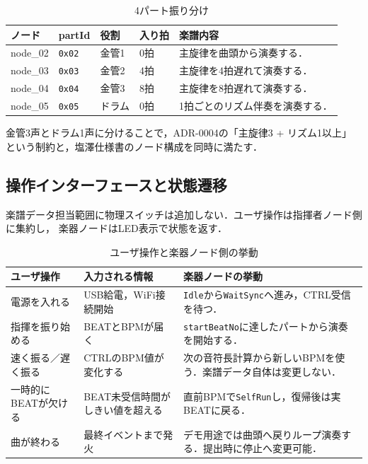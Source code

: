 \documentclass[uplatex,dvipdfmx]{jlreq}
\newcommand{\code}[1]{\texttt{#1}}
\begin{document}
\begin{table}[h]
\centering
\caption{4パート振り分け}
\label{tab:part-map}
\begin{tabular}{p{}p{}p{}p{}p{}}
\toprule
\textbf{ノード} & \textbf{partId} & \textbf{役割} & \textbf{入り拍} & \textbf{楽譜内容} \\
\midrule
node\_02 & \code{0x02} & 金管1 & 0拍 & 主旋律を曲頭から演奏する．\\
node\_03 & \code{0x03} & 金管2 & 4拍 & 主旋律を4拍遅れて演奏する．\\
node\_04 & \code{0x04} & 金管3 & 8拍 & 主旋律を8拍遅れて演奏する．\\
node\_05 & \code{0x05} & ドラム & 0拍 & 1拍ごとのリズム伴奏を演奏する．\\
\bottomrule
\end{tabular}
\end{table}

金管3声とドラム1声に分けることで，ADR-0004の「主旋律3 + リズム1以上」
という制約と，塩澤仕様書のノード構成を同時に満たす．

\subsection{操作インターフェースと状態遷移}

楽譜データ担当範囲に物理スイッチは追加しない．ユーザ操作は指揮者ノード側に集約し，
楽器ノードはLED表示で状態を返す．

\begin{table}[h]
\centering
\caption{ユーザ操作と楽器ノード側の挙動}
\label{tab:user-flow}
\begin{tabular}{p{}p{}p{}}
\toprule
\textbf{ユーザ操作} & \textbf{入力される情報} & \textbf{楽器ノードの挙動} \\
\midrule
電源を入れる & USB給電，WiFi接続開始 & \code{Idle}から\code{WaitSync}へ進み，CTRL受信を待つ．\\
指揮を振り始める & BEATとBPMが届く & \code{startBeatNo}に達したパートから演奏を開始する．\\
速く振る／遅く振る & CTRLのBPM値が変化する & 次の音符長計算から新しいBPMを使う．楽譜データ自体は変更しない．\\
一時的にBEATが欠ける & BEAT未受信時間がしきい値を超える & 直前BPMで\code{SelfRun}し，復帰後は実BEATに戻る．\\
曲が終わる & 最終イベントまで発火 & デモ用途では曲頭へ戻りループ演奏する．提出時に停止へ変更可能．\\
\bottomrule
\end{tabular}
\end{table}
\end{document}
